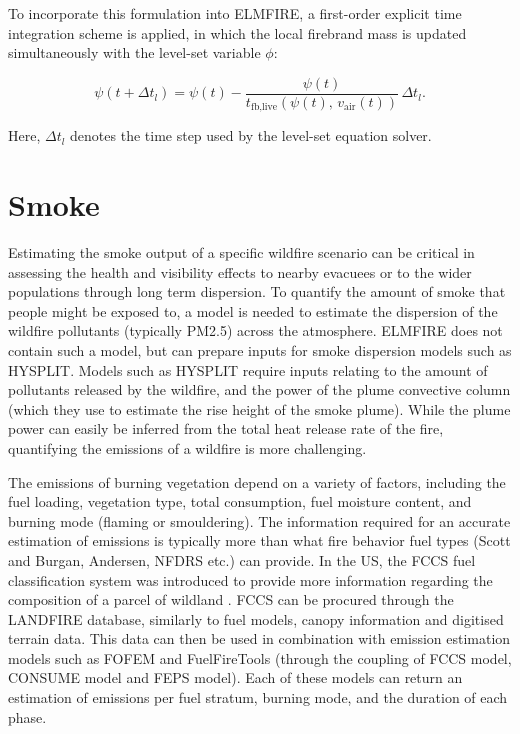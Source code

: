 To incorporate this formulation into ELMFIRE, a first-order explicit time integration scheme is applied, in which the local firebrand mass is updated simultaneously with the level-set variable $\phi$:

\begin{equation}
    \psi(t+\Delta t_l) = \psi(t) - \frac{\psi(t)}{t_{\text{fb,live}}\!\left(\psi(t),\, v_{\text{air}}(t)\right)} \, \Delta t_l.
\end{equation}

Here, $\Delta t_l$ denotes the time step used by the level-set equation solver.
\section{Smoke}

Estimating the smoke output of a specific wildfire scenario can be critical in assessing the health and visibility effects to nearby evacuees or to the wider populations through long term dispersion. To quantify the amount of smoke that people might be exposed to, a model is needed to estimate the dispersion of the wildfire pollutants (typically PM2.5) across the atmosphere. ELMFIRE does not contain such a model, but can prepare inputs for smoke dispersion models such as HYSPLIT. Models such as HYSPLIT require inputs relating to the amount of pollutants released by the wildfire, and the power of the plume convective column (which they use to estimate the rise height of the smoke plume). While the plume power can easily be inferred from the total heat release rate of the fire, quantifying the emissions of a wildfire is more challenging. 

The emissions of burning vegetation depend on a variety of factors, including the fuel loading, vegetation type, total consumption, fuel moisture content, and burning mode (flaming or smouldering). The information required for an accurate estimation of emissions is typically more than what fire behavior fuel types (Scott and Burgan, Andersen, NFDRS etc.) can provide. In the US, the FCCS fuel classification system was introduced to provide more information regarding the composition of a parcel of wildland \cite{ottmarOverviewFuelCharacteristic2007}. FCCS can be procured through the LANDFIRE database, similarly to fuel models, canopy information and digitised terrain data. This data can then be used in combination with emission estimation models such as FOFEM and FuelFireTools (through the coupling of FCCS model, CONSUME model and FEPS model). Each of these models can return an estimation of emissions per fuel stratum, burning mode, and the duration of each phase. 


